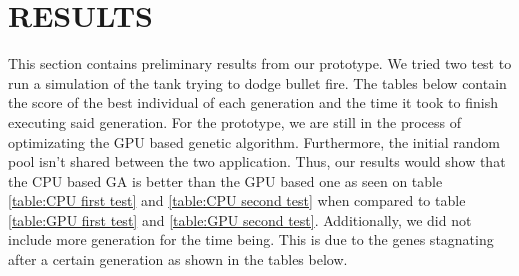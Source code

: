 \chapter{RESULTS}
This section contains preliminary results from our prototype. We tried two test to run a simulation of the tank
trying to dodge bullet fire.  The tables below contain the score of the best individual of each generation and the time
it took to finish executing said generation. For the prototype, we are still in the process of optimizating the GPU
based genetic algorithm. Furthermore, the initial random pool isn't shared between the two application.
Thus, our results would show that the CPU based GA is better than the GPU based one as seen on table 
\ref{table:CPU first test} and \ref{table:CPU second test} when compared to table \ref{table:GPU first test} and 
\ref{table:GPU second test}. Additionally, we did not include more generation for the time being. This is due to
the genes stagnating after a certain generation as shown in the tables below.


